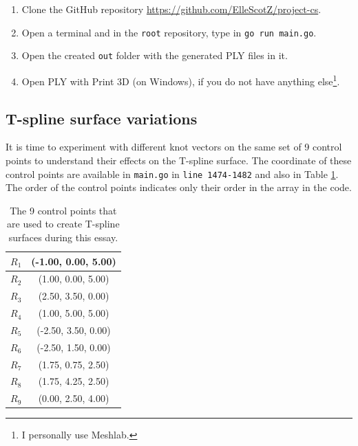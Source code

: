 \documentclass{article}
\begin{document}
\begin{enumerate}
\item Clone the GitHub repository \url{https://github.com/ElleScotZ/project-cs}.

\item Open a terminal and in the \texttt{root} repository, type in \texttt{go run main.go}.

\item Open the created \texttt{out} folder with the generated PLY files in it.

\item Open PLY with Print 3D (on Windows), if you do not have anything else\footnote{I personally use Meshlab.}.
\end{enumerate}

\vspace{12pt}

\begin{large}
\section{T-spline surface variations}
\label{sec:exp}
\end{large}

\vspace{12pt}

It is time to experiment with different knot vectors on the same set of 9 control points to understand their effects on the T-spline surface. The coordinate of these control points are available in \texttt{main.go} in \texttt{line 1474-1482} and also in Table \ref{cps}. The order of the control points indicates only their order in the array in the code.

\begin{table}[H]
\centering
\begin{tabular}{| c | c |}
\hline
$R_1$ & (-1.00, 0.00, 5.00) \\ \hline
$R_2$ & (1.00, 0.00, 5.00) \\ \hline
$R_3$ & (2.50, 3.50, 0.00) \\ \hline
$R_4$ & (1.00, 5.00, 5.00) \\ \hline
$R_5$ & (-2.50, 3.50, 0.00) \\ \hline
$R_6$ & (-2.50, 1.50, 0.00) \\ \hline
$R_7$ & (1.75, 0.75, 2.50) \\ \hline
$R_8$ & (1.75, 4.25, 2.50) \\ \hline
$R_9$ & (0.00, 2.50, 4.00) \\
\hline
\end{tabular}
\caption{The 9 control points that are used to create T-spline surfaces during this essay.}
\label{cps}
\end{table}
\end{document}
